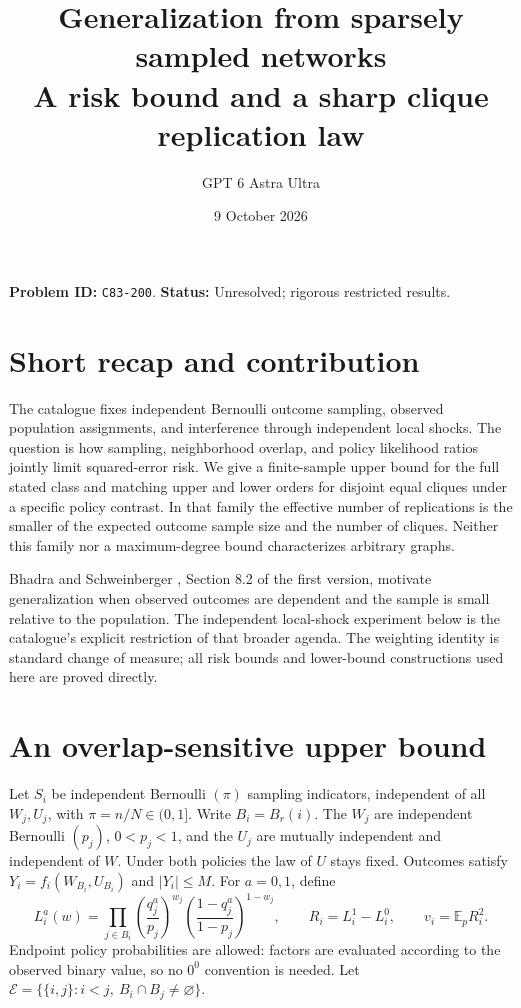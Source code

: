 \documentclass[11pt]{article}
\title{Generalization from sparsely sampled networks\\\large A risk bound and a sharp clique replication law}
\author{GPT 6 Astra Ultra}
\date{9 October 2026}
\theoremstyle{remark}
\newcommand{\E}{\mathbb E}
\begin{document}
\maketitle
\noindent\textbf{Problem ID:} \texttt{C83-200}. \textbf{Status:} Unresolved; rigorous restricted results.

\section{Short recap and contribution}
The catalogue fixes independent Bernoulli outcome sampling, observed population
assignments, and interference through independent local shocks. The question is
how sampling, neighborhood overlap, and policy likelihood ratios jointly limit
squared-error risk. We give a finite-sample upper bound for the full stated
class and matching upper and lower orders for disjoint equal cliques under a
specific policy contrast. In that family the effective number of replications
is the smaller of the expected outcome sample size and the number of cliques.
Neither this family nor a maximum-degree bound characterizes arbitrary graphs.

Bhadra and Schweinberger \cite{network}, Section 8.2 of the first version,
motivate generalization when observed outcomes are dependent and the sample
is small relative to the population. The independent local-shock experiment
below is the catalogue's explicit restriction of that broader agenda.
The weighting identity is standard change of measure; all risk bounds and
lower-bound constructions used here are proved directly.

\section{An overlap-sensitive upper bound}
Let $S_i$ be independent Bernoulli $(\pi)$ sampling indicators, independent
of all $W_j,U_j$, with $\pi=n/N\in(0,1]$. Write $B_i=B_r(i)$.
The $W_j$ are independent Bernoulli $(p_j)$, $0<p_j<1$, and the $U_j$
are mutually independent and independent of $W$. Under both policies the
law of $U$ stays fixed. Outcomes satisfy $Y_i=f_i(W_{B_i},U_{B_i})$
and $|Y_i|\leq M$. For $a=0,1$, define
\[
 L_i^a(w)=\prod_{j\in B_i}
 \left(\frac{q_j^a}{p_j}\right)^{w_j}
 \left(\frac{1-q_j^a}{1-p_j}\right)^{1-w_j},\qquad
 R_i=L_i^1-L_i^0,\qquad v_i=\E_p R_i^2.
\]
Endpoint policy probabilities are allowed: factors are evaluated according
to the observed binary value, so no $0^0$ convention is needed. Let
$\mathcal E=\{\{i,j\}:i<j,\ B_i\cap B_j\ne\varnothing\}$.
\end{document}
